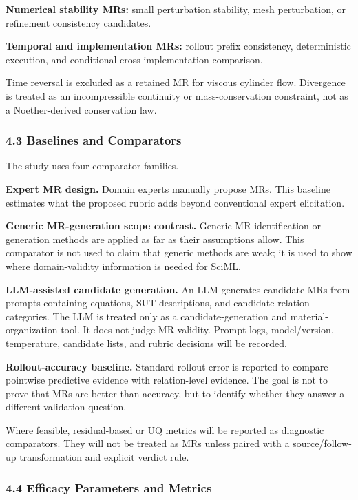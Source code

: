 \textbf{Numerical stability MRs:} small perturbation stability, mesh
perturbation, or refinement consistency candidates.

\textbf{Temporal and implementation MRs:} rollout prefix consistency,
deterministic execution, and conditional cross-implementation
comparison.

Time reversal is excluded as a retained MR for viscous cylinder flow.
Divergence is treated as an incompressible continuity or
mass-conservation constraint, not as a Noether-derived conservation law.

\subsubsection{4.3 Baselines and
Comparators}\label{baselines-and-comparators}

The study uses four comparator families.

\textbf{Expert MR design.} Domain experts manually propose MRs. This
baseline estimates what the proposed rubric adds beyond conventional
expert elicitation.

\textbf{Generic MR-generation scope contrast.} Generic MR identification
or generation methods are applied as far as their assumptions allow.
This comparator is not used to claim that generic methods are weak; it
is used to show where domain-validity information is needed for SciML.

\textbf{LLM-assisted candidate generation.} An LLM generates candidate
MRs from prompts containing equations, SUT descriptions, and candidate
relation categories. The LLM is treated only as a candidate-generation
and material-organization tool. It does not judge MR validity. Prompt
logs, model/version, temperature, candidate lists, and rubric decisions
will be recorded.

\textbf{Rollout-accuracy baseline.} Standard rollout error is reported
to compare pointwise predictive evidence with relation-level evidence.
The goal is not to prove that MRs are better than accuracy, but to
identify whether they answer a different validation question.

Where feasible, residual-based or UQ metrics will be reported as
diagnostic comparators. They will not be treated as MRs unless paired
with a source/follow-up transformation and explicit verdict rule.

\subsubsection{4.4 Efficacy Parameters and
Metrics}\label{efficacy-parameters-and-metrics}


